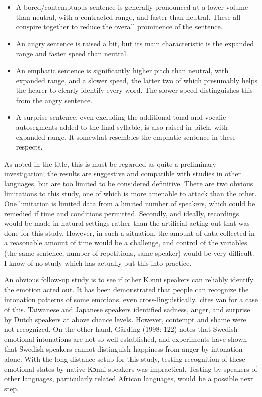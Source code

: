 \documentclass[output=paper]{langsci/langscibook}
\begin{document}
\begin{itemize}
\item A bored/contemptuous sentence is generally pronounced at a lower volume than neutral, with a contracted range, and faster than neutral. These all conspire together to reduce the overall prominence of the sentence.
\item An angry sentence is raised a bit, but its main characteristic is the expanded range and faster speed than neutral.
\item An emphatic sentence is significantly higher pitch than neutral, with expanded range, and a slower speed, the latter two of which presumably helps the hearer to clearly identify every word. The slower speed distinguishes this from the angry sentence.
\item A surprise sentence, even excluding the additional tonal and vocalic autosegments added to the final syllable, is also raised in pitch, with expanded range. It somewhat resembles the emphatic sentence in these respects. 
\end{itemize}

As noted in the title, this is must be regarded as quite a preliminary investigation; the results are suggestive and compatible with studies in other languages, but are too limited to be considered definitive. There are two obvious limitations to this study, one of which is more amenable to attack than the other. One limitation is limited data from a limited number of speakers, which could be remedied if time and conditions permitted. Secondly, and ideally, recordings would be made in natural settings rather than the artificial acting out that was done for this study. However, in such a situation, the amount of data collected in a reasonable amount of time would be a challenge, and control of the variables (the same sentence, number of repetitions, same speaker) would be very difficult. I know of no study which has actually put this into practice.

An obvious follow-up study is to see if other Kɔnni speakers can reliably identify the emotion acted out. It has been demonstrated that people can recognize the intonation patterns of some emotions, even cross-linguistically. \citet[72]{Gussenhoven2004} cites van \citet[128]{Bezooijen1984} for a case of this. Taiwanese and Japanese speakers identified sadness, anger, and surprise by Dutch speakers at above chance levels. However, contempt and shame were not recognized. On the other hand, Gårding (1998: 122) notes that Swedish emotional intonations are not so well established, and experiments have shown that Swedish speakers cannot distinguish happiness from anger by intonation alone. With the long-distance setup for this study, testing recognition of these emotional states by native Kɔnni speakers was impractical. Testing by speakers of other languages, particularly related African languages, would be a possible next step.
\end{document}
